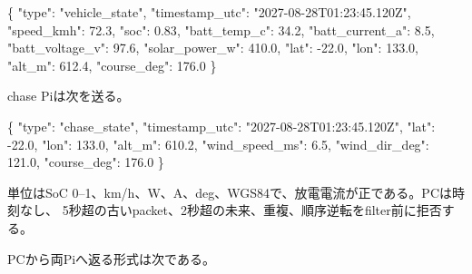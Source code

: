 \documentclass[
  japanese,
  a4paper,
]{article}
\newenvironment{Shaded}{}{}
\newcommand{\DataTypeTok}[1]{\textcolor[rgb]{0.56,0.13,0.00}{#1}}
\newcommand{\FloatTok}[1]{\textcolor[rgb]{0.25,0.63,0.44}{#1}}
\newcommand{\FunctionTok}[1]{\textcolor[rgb]{0.02,0.16,0.49}{#1}}
\newcommand{\StringTok}[1]{\textcolor[rgb]{0.25,0.44,0.63}{#1}}
\begin{document}
\begin{Shaded}
\begin{Highlighting}[]
\FunctionTok{\{}
  \DataTypeTok{"type"}\FunctionTok{:} \StringTok{"vehicle\_state"}\FunctionTok{,}
  \DataTypeTok{"timestamp\_utc"}\FunctionTok{:} \StringTok{"2027{-}08{-}28T01:23:45.120Z"}\FunctionTok{,}
  \DataTypeTok{"speed\_kmh"}\FunctionTok{:} \FloatTok{72.3}\FunctionTok{,}
  \DataTypeTok{"soc"}\FunctionTok{:} \FloatTok{0.83}\FunctionTok{,}
  \DataTypeTok{"batt\_temp\_c"}\FunctionTok{:} \FloatTok{34.2}\FunctionTok{,}
  \DataTypeTok{"batt\_current\_a"}\FunctionTok{:} \FloatTok{8.5}\FunctionTok{,}
  \DataTypeTok{"batt\_voltage\_v"}\FunctionTok{:} \FloatTok{97.6}\FunctionTok{,}
  \DataTypeTok{"solar\_power\_w"}\FunctionTok{:} \FloatTok{410.0}\FunctionTok{,}
  \DataTypeTok{"lat"}\FunctionTok{:} \FloatTok{{-}22.0}\FunctionTok{,}
  \DataTypeTok{"lon"}\FunctionTok{:} \FloatTok{133.0}\FunctionTok{,}
  \DataTypeTok{"alt\_m"}\FunctionTok{:} \FloatTok{612.4}\FunctionTok{,}
  \DataTypeTok{"course\_deg"}\FunctionTok{:} \FloatTok{176.0}
\FunctionTok{\}}
\end{Highlighting}
\end{Shaded}

chase Piは次を送る。

\begin{Shaded}
\begin{Highlighting}[]
\FunctionTok{\{}
  \DataTypeTok{"type"}\FunctionTok{:} \StringTok{"chase\_state"}\FunctionTok{,}
  \DataTypeTok{"timestamp\_utc"}\FunctionTok{:} \StringTok{"2027{-}08{-}28T01:23:45.120Z"}\FunctionTok{,}
  \DataTypeTok{"lat"}\FunctionTok{:} \FloatTok{{-}22.0}\FunctionTok{,}
  \DataTypeTok{"lon"}\FunctionTok{:} \FloatTok{133.0}\FunctionTok{,}
  \DataTypeTok{"alt\_m"}\FunctionTok{:} \FloatTok{610.2}\FunctionTok{,}
  \DataTypeTok{"wind\_speed\_ms"}\FunctionTok{:} \FloatTok{6.5}\FunctionTok{,}
  \DataTypeTok{"wind\_dir\_deg"}\FunctionTok{:} \FloatTok{121.0}\FunctionTok{,}
  \DataTypeTok{"course\_deg"}\FunctionTok{:} \FloatTok{176.0}
\FunctionTok{\}}
\end{Highlighting}
\end{Shaded}

単位はSoC
0--1、km/h、W、A、deg、WGS84で、放電電流が正である。PCは時刻なし、
5秒超の古いpacket、2秒超の未来、重複、順序逆転をfilter前に拒否する。

PCから両Piへ返る形式は次である。
\end{document}
